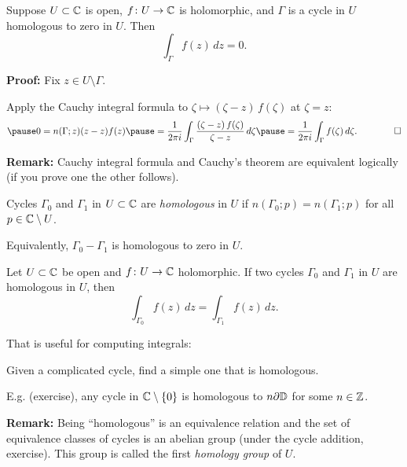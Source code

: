 \documentclass[10pt,aspectratio=169]{beamer}
\begin{document}
\begin{frame}

\begin{theorem}
Suppose $U \subset {\mathbb{C}}$ is open,
$f \colon U \to {\mathbb{C}}$ is holomorphic,
and $\Gamma$ is
a cycle
in $U$
homologous to zero in $U$.
Then
\begin{equation*}
\int_\Gamma f(z) \, dz = 0 .
\end{equation*}
\end{theorem}

\pause

\textbf{Proof:}
Fix $z \in U \setminus \Gamma$.

\medskip
\pause
Apply 
the Cauchy integral formula to $\zeta \mapsto (\zeta-z)\,f(\zeta)$ at
$\zeta=z$:
\[
\pause
0 = n(\Gamma;z) (z-z)f(z)
\pause
=
\frac{1}{2\pi i} \int_\Gamma \frac{(\zeta-z)\,f(\zeta)}{\zeta-z} \, d\zeta
\pause
=
\frac{1}{2\pi i} \int_\Gamma f(\zeta) \, d\zeta .
\qquad
\qed
\]

\pause

\textbf{Remark:} Cauchy integral formula and Cauchy's theorem are equivalent
logically (if you prove one the other follows).

\end{frame}

\begin{frame}

\begin{definition}
Cycles
$\Gamma_0$ and $\Gamma_1$ in $U
\subset {\mathbb{C}}$ are \emph{homologous} in $U$
if $n(\Gamma_0;p) = n(\Gamma_1;p)$ for all $p \in {\mathbb{C}} \setminus U$.
\end{definition}

Equivalently, $\Gamma_0-\Gamma_1$ is homologous to zero in $U$.

\pause

\begin{corollary}
Let $U \subset {\mathbb{C}}$ be open and $f \colon U \to {\mathbb{C}}$ holomorphic.
If two cycles
$\Gamma_0$ and $\Gamma_1$ in $U$
are homologous in $U$, then
\begin{equation*}
\int_{\Gamma_0} f(z)\, dz = 
\int_{\Gamma_1} f(z)\, dz .
\end{equation*}
\end{corollary}

\pause

That is useful for computing integrals:

Given a complicated cycle, find a
simple one that is homologous.

\pause
\medskip

E.g. (exercise), any cycle in ${\mathbb{C}} \setminus \{ 0 \}$ is homologous to
$n \partial {\mathbb{D}}$ for some $n \in {\mathbb{Z}}$.

\pause
\medskip

\textbf{Remark:} Being ``homologous'' is an equivalence relation and the set of 
equivalence classes of cycles is an abelian group (under the cycle addition,
exercise).  This group is called the
first \emph{homology group} of $U$.
\end{frame}
\end{document}
